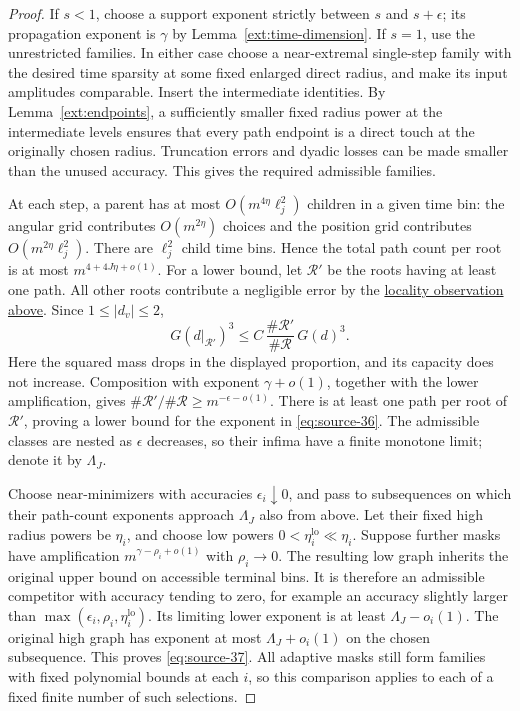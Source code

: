 \begin{proof}
If \(s<1\), choose a support exponent strictly between \(s\) and
\(s+\epsilon\); its propagation exponent is \(\gamma\) by
Lemma~\ref{ext:time-dimension}. If \(s=1\), use the unrestricted
families. In either case choose a near-extremal single-step family
with the desired time sparsity at some fixed enlarged direct radius,
and make its input amplitudes comparable. Insert the intermediate
identities. By Lemma~\ref{ext:endpoints}, a sufficiently smaller fixed
radius power at the intermediate levels ensures that every path
endpoint is a direct touch at the originally chosen radius.
Truncation errors and dyadic losses can be made smaller than the
unused accuracy. This gives the required admissible families.

At each step, a parent has at most
\(O(m^{4\eta}\ell_j^2)\) children in a given time bin: the angular
grid contributes \(O(m^{2\eta})\) choices and the position grid
contributes \(O(m^{2\eta}\ell_j^2)\). There are \(\ell_j^2\) child
time bins. Hence the total path count per root is at most
\(m^{4+4J\eta+o(1)}\). For a lower bound, let
\(\mathcal R'\) be the roots having at least one path. All other
roots contribute a negligible error by the
\hyperref[ext:diagram-locality]{locality observation above}.
Since \(1\leq|d_v|\leq2\),
\[
 G(d|_{\mathcal R'})^3
 \leq C\,\frac{\#\mathcal R'}{\#\mathcal R}\,G(d)^3.
\]
Here the squared mass drops in the displayed proportion, and its
capacity does not increase. Composition with exponent
\(\gamma+o(1)\), together with the lower amplification, gives
\(\#\mathcal R'/\#\mathcal R\geq m^{-\epsilon-o(1)}\).
There is at least one path per root of \(\mathcal R'\), proving
a lower bound for the exponent in \eqref{eq:source-36}.
The admissible classes are nested as \(\epsilon\) decreases, so
their infima have a finite monotone limit; denote it by \(\Lambda_J\).

Choose near-minimizers with accuracies \(\epsilon_i\downarrow0\),
and pass to subsequences on which their path-count exponents
approach \(\Lambda_J\) also from above. Let their fixed high radius
powers be \(\eta_i\), and choose low powers
\(0<\eta_i^{\mathrm{lo}}\ll\eta_i\).
Suppose further masks have amplification \(m^{\gamma-\rho_i+o(1)}\)
with \(\rho_i\to0\). The resulting low graph inherits the original
upper bound on accessible terminal bins. It is therefore an
admissible competitor with accuracy tending to zero, for example
an accuracy slightly larger than
\(\max(\epsilon_i,\rho_i,\eta_i^{\mathrm{lo}})\).
Its limiting lower exponent is at least \(\Lambda_J-o_i(1)\).
The original high graph has exponent at most
\(\Lambda_J+o_i(1)\) on the chosen subsequence. This proves
\eqref{eq:source-37}. All adaptive masks still form families with
fixed polynomial bounds at each \(i\), so this comparison applies
to each of a fixed finite number of such selections.
\end{proof}


